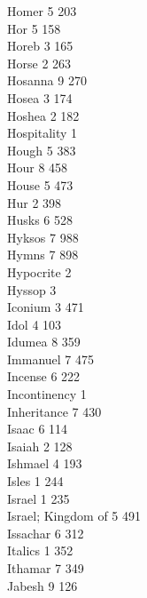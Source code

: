 Homer \hfill 5 \quad \phantom{0}203\\
Hor \hfill 5 \quad \phantom{0}158\\
Horeb \hfill 3 \quad \phantom{0}165\\
Horse \hfill 2 \quad \phantom{0}263\\
Hosanna \hfill 9 \quad \phantom{0}270\\
Hosea \hfill 3 \quad \phantom{0}174\\
Hoshea \hfill 2 \quad \phantom{0}182\\
Hospitality \hfill 1 \\
Hough \hfill 5 \quad \phantom{0}383\\
Hour \hfill 8 \quad \phantom{0}458\\
House \hfill 5 \quad \phantom{0}473\\
Hur \hfill 2 \quad \phantom{0}398\\
Husks \hfill 6 \quad \phantom{0}528\\
Hyksos \hfill 7 \quad \phantom{0}988\\
Hymns \hfill 7 \quad \phantom{0}898\\
Hypocrite \hfill 2 \\
Hyssop \hfill 3 \\
Iconium \hfill 3 \quad \phantom{0}471\\
Idol \hfill 4 \quad \phantom{0}103\\
Idumea \hfill 8 \quad \phantom{0}359\\
Immanuel \hfill 7 \quad \phantom{0}475\\
Incense \hfill 6 \quad \phantom{0}222\\
Incontinency \hfill 1 \\
Inheritance \hfill 7 \quad \phantom{0}430\\
Isaac \hfill 6 \quad \phantom{0}114\\
Isaiah \hfill 2 \quad \phantom{0}128\\
Ishmael \hfill 4 \quad \phantom{0}193\\
Isles \hfill 1 \quad \phantom{0}244\\
Israel \hfill 1 \quad \phantom{0}235\\
Israel; Kingdom of \hfill 5 \quad \phantom{0}491\\
Issachar \hfill 6 \quad \phantom{0}312\\
Italics \hfill 1 \quad \phantom{0}352\\
Ithamar \hfill 7 \quad \phantom{0}349\\
Jabesh \hfill 9 \quad \phantom{0}126\\
